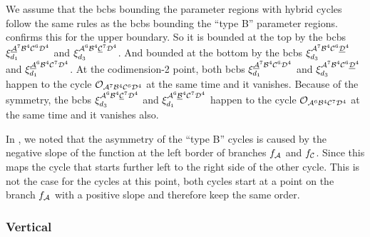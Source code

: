 We assume that the \glspl{bcb} bounding the parameter regions with hybrid cycles follow the same rules as the \glspl{bcb} bounding the ``type B'' parameter regions.
 confirms this for the upper boundary.
So it is bounded at the top by the \glspl{bcb} $\xi_{d_1}^{\underline{\mathcal{A}}^7\mathcal{B}^4\mathcal{C}^6\mathcal{D}^4}$ and $\xi_{d_3}^{\mathcal{A}^6\mathcal{B}^4\underline{\mathcal{C}}^7\mathcal{D}^4}$.
And bounded at the bottom by the \glspl{bcb} $\xi_{d_3}^{\mathcal{A}^7\mathcal{B}^4\mathcal{C}^6\underline{\mathcal{D}}^4}$ and $\xi_{d_1}^{\underline{\mathcal{A}}^6\mathcal{B}^4\mathcal{C}^7\mathcal{D}^4}$.
At the codimension-2 point, both \glspl{bcb} $\xi_{d_1}^{\underline{\mathcal{A}}^7\mathcal{B}^4\mathcal{C}^6\mathcal{D}^4}$ and $\xi_{d_3}^{\mathcal{A}^7\mathcal{B}^4\mathcal{C}^6\underline{\mathcal{D}}^4}$ happen to the cycle $\mathcal{O}_{\mathcal{A}^7\mathcal{B}^4\mathcal{C}^6\mathcal{D}^4}$ at the same time and it vanishes.
Because of the symmetry, the \glspl{bcb} $\xi_{d_3}^{\mathcal{A}^6\mathcal{B}^4\underline{\mathcal{C}}^7\mathcal{D}^4}$ and $\xi_{d_1}^{\mathcal{A}^6\underline{\mathcal{B}}^4\mathcal{C}^7\mathcal{D}^4}$ happen to the cycle $\mathcal{O}_{\mathcal{A}^6\mathcal{B}^4\mathcal{C}^7\mathcal{D}^4}$ at the same time and it vanishes also.




In , we noted that the asymmetry of the ``type B'' cycles is caused by the negative slope of the function at the left border of branches $f_{\mathcal{A}}$ and $f_{\mathcal{C}}$.
Since this maps the cycle that starts further left to the right side of the other cycle.
This is not the case for the cycles at this point, both cycles start at a point on the branch $f_{\mathcal{A}}$ with a positive slope and therefore keep the same order.

\subsubsection{Vertical}

